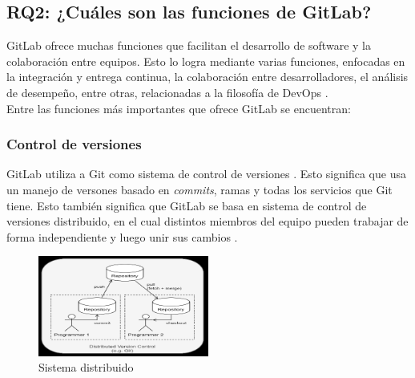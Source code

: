 \documentclass[runningheads]{llncs}
\begin{document}
\subsection{RQ2: ¿Cuáles son las funciones de GitLab?}
GitLab ofrece muchas funciones que facilitan el desarrollo de software y la colaboración entre equipos. Esto lo
logra mediante varias funciones, enfocadas en la integración y entrega continua, la colaboración entre desarrolladores,
el análisis de desempeño, entre otras, relacionadas a la filosofía de DevOps \cite{fairbanks2023analyzing}.\\
Entre las funciones más importantes que ofrece GitLab se encuentran:
\subsubsection{Control de versiones}
GitLab utiliza a Git como sistema de control de versiones \cite{choudhury2020gitlab}. Esto significa que usa un
manejo de versones basado en \textit{commits}, ramas y todas los servicios que Git tiene. Esto también significa que GitLab
se basa en sistema de control de versiones distribuido, en el cual distintos miembros del equipo pueden trabajar
de forma independiente y luego unir sus cambios \cite{alvin2023devops}.
\begin{figure}[htbp]
        \centering
        \includegraphics[width=0.5\textwidth]{Distributed.png}
        \caption{Sistema distribuido}
        \label{fig:sys-dis}
\end{figure}
\end{document}
